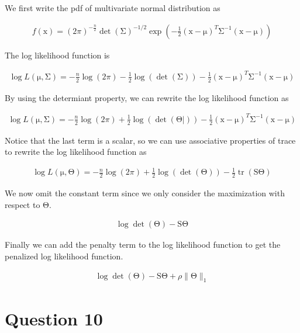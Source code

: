 \documentclass{article}
\newcommand{\vect}[1]{\boldsymbol{\mathrm{#1}}}
\DeclareMathOperator{\tr}{tr}
\begin{document}
We first write the pdf of multivariate normal distribution as

\begin{align*}
  f(\vect x) = (2\pi)^{-\frac{n}{2}} \det(\vect \Sigma)^{-1/2} \exp\left(-\frac{1}{2} (\vect x - \vect \mu)^T\vect \Sigma^{-1}(\vect x - \vect \mu)\right)
\end{align*}

The log likelihood function is

\begin{align*}
  \log L(\vect \mu, \vect \Sigma) = -\frac{n}{2} \log(2\pi) - \frac{1}{2} \log(\det(\vect \Sigma)) - \frac{1}{2} (\vect x - \vect \mu)^T\vect \Sigma^{-1}(\vect x - \vect \mu)
\end{align*}

By using the determiant property, we can rewrite the log likelihood function as

\begin{align*}
  \log L(\vect \mu, \vect \Sigma) = -\frac{n}{2} \log(2\pi) + \frac{1}{2} \log(\det(\vect \Theta|)) - \frac{1}{2} (\vect x - \vect \mu)^T\vect \Sigma^{-1}(\vect x - \vect \mu)
\end{align*}

Notice that the last term is a scalar, so we can use associative properties of trace to rewrite the log likelihood function as

\begin{align*}
  \log L(\vect \mu, \vect \Theta) = -\frac{n}{2} \log(2\pi) + \frac{1}{2} \log(\det(\vect \Theta)) - \frac{1}{2} \tr(\vect S \vect \Theta)
\end{align*}

We now omit the constant term since we only consider the maximization with respect to \(\vect \Theta\).

\begin{align*}
  \log \det(\vect \Theta)- \vect S\vect \Theta
\end{align*}

Finally we can add the penalty term to the log likelihood function to get the penalized log likelihood function.

\begin{align*}
 \log \det(\vect \Theta)- \vect S\vect \Theta + \rho \|\vect \Theta\|_1
\end{align*}

\section*{Question 10}
\end{document}
